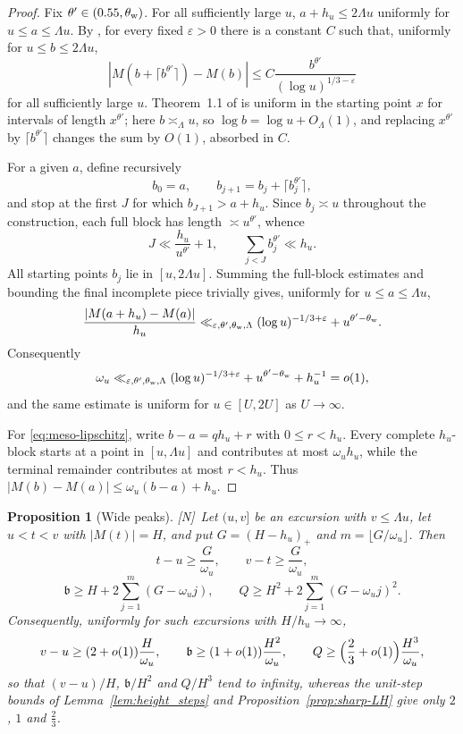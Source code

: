 \documentclass[11pt]{amsart}
\numberwithin{equation}{section}
\theoremstyle{plain}
\newtheorem{proposition}[theorem]{Proposition}
\theoremstyle{definition}
\theoremstyle{remark}
\newcommand{\tagN}{\textup{[N]}}
\begin{document}
\begin{proof}
Fix $\theta'\in(0.55,\theta_{\rm w})$. For all sufficiently large $u$,
$a+h_u\le2\Lambda u$ uniformly for $u\le a\le\Lambda u$. By
\cite[Theorem~1.1]{MatomakiTeravainen2023}, for every fixed
$\varepsilon>0$ there is a constant $C$ such that, uniformly for
$u\le b\le2\Lambda u$,
\[
\left|M\!\left(b+\lceil b^{\theta'}\rceil\right)-M(b)\right|
\le C\frac{b^{\theta'}}{(\log u)^{1/3-\varepsilon}}
\]
for all sufficiently large $u$. Theorem~1.1 of
\cite{MatomakiTeravainen2023} is uniform in the starting point $x$ for
intervals of length $x^{\theta'}$; here $b\asymp_\Lambda u$, so
$\log b=\log u+O_\Lambda(1)$, and replacing $x^{\theta'}$ by
$\lceil b^{\theta'}\rceil$ changes the sum by $O(1)$, absorbed in $C$.

For a given $a$, define recursively
\[
 b_0=a,\qquad b_{j+1}=b_j+\lceil b_j^{\theta'}\rceil,
\]
and stop at the first $J$ for which $b_{J+1}>a+h_u$. Since
$b_j\asymp u$ throughout the construction, each full block has length
$\asymp u^{\theta'}$, whence
\[
 J\ll \frac{h_u}{u^{\theta'}}+1,
 \qquad
 \sum_{j<J}b_j^{\theta'}\ll h_u.
\]
All starting points $b_j$ lie in $[u,2\Lambda u]$. Summing the full-block
estimates and bounding the final incomplete piece trivially gives,
uniformly for $u\le a\le\Lambda u$,
\[
\frac{|M(a+h_u)-M(a)|}{h_u}
\ll_{\varepsilon,\theta',\theta_{\rm w},\Lambda}
(\log u)^{-1/3+\varepsilon}+u^{\theta'-\theta_{\rm w}}.
\]
Consequently
\begin{equation}
\label{eq:eta-uniform}
\omega_u\ll_{\varepsilon,\theta',\theta_{\rm w},\Lambda}
(\log u)^{-1/3+\varepsilon}+u^{\theta'-\theta_{\rm w}}+h_u^{-1}=o(1),
\end{equation}
and the same estimate is uniform for $u\in[U,2U]$ as $U\to\infty$.

For \eqref{eq:meso-lipschitz}, write $b-a=qh_u+r$ with $0\le r<h_u$.
Every complete $h_u$-block starts at a point in $[u,\Lambda u]$ and
contributes at most $\omega_u h_u$, while the terminal remainder contributes
at most $r<h_u$. Thus
$|M(b)-M(a)|\le\omega_u(b-a)+h_u$.
\end{proof}

\begin{proposition}[Wide peaks]
\label{prop:wide-peaks}
\tagN\ Let $(u,v]$ be an excursion with $v\le\Lambda u$, let $u<t<v$ with
$|M(t)|=H$, and put $G=(H-h_u)_+$ and $m=\lfloor G/\omega_u\rfloor$. Then
\[
t-u\ge\frac G{\omega_u},\qquad v-t\ge\frac G{\omega_u},
\]
\[
\mathfrak b\ge H+2\sum_{j=1}^m(G-\omega_uj),\qquad
Q\ge H^2+2\sum_{j=1}^m(G-\omega_uj)^2 .
\]
Consequently, uniformly for such excursions with $H/h_u\to\infty$,
\[
v-u\ge(2+o(1))\frac H{\omega_u},\qquad
\mathfrak b\ge(1+o(1))\frac{H^2}{\omega_u},\qquad
Q\ge\Bigl(\frac23+o(1)\Bigr)\frac{H^3}{\omega_u},
\]
so that $(v-u)/H$, $\mathfrak b/H^2$ and $Q/H^3$ tend to infinity, whereas the
unit-step bounds of Lemma~\ref{lem:height_steps} and
Proposition~\ref{prop:sharp-LH} give only $2$, $1$ and $\frac23$.
\end{proposition}
\end{document}

